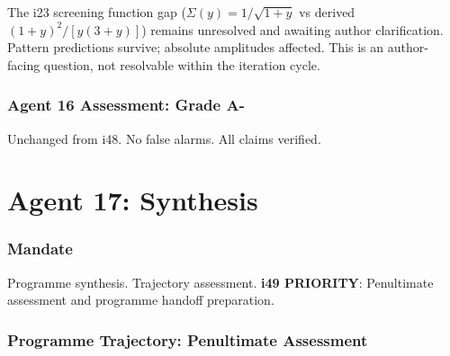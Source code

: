 \documentclass[11pt,a4paper]{article}
\begin{document}
The i23 screening function gap ($\Sigma(y) = 1/\sqrt{1+y}$ vs derived $(1+y)^2/[y(3+y)]$) remains unresolved and awaiting author clarification. Pattern predictions survive; absolute amplitudes affected. This is an author-facing question, not resolvable within the iteration cycle.

\section{Agent 16 Assessment: Grade A-}

Unchanged from i48. No false alarms. All claims verified.


\part{Agent 17: Synthesis}
\label{part:agent17}

\section{Mandate}

Programme synthesis. Trajectory assessment. \textbf{i49 PRIORITY}: Penultimate assessment and programme handoff preparation.

\section{Programme Trajectory: Penultimate Assessment}
\end{document}
